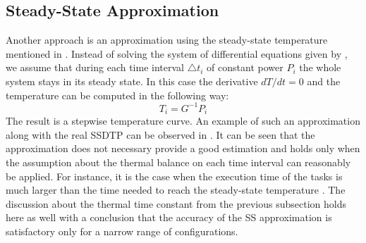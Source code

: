 \subsection{Steady-State Approximation}
Another approach is an approximation using the steady-state temperature mentioned in \cite{huang2009}. Instead of solving the system of differential equations given by , we assume that during each time interval $\triangle t_i$ of constant power $P_i$ the whole system stays in its steady state. In this case the derivative \mbox{$dT/dt = 0$} and the temperature can be computed in the following way:
\[
  T_i = G^{-1} P_i
\]
The result is a stepwise temperature curve. An example of such an approximation along with the real SSDTP can be observed in . It can be seen that the approximation does not necessary provide a good estimation and holds only when the assumption about the thermal balance on each time interval can reasonably be applied. For instance, it is the case when the execution time of the tasks is much larger than the time needed to reach the steady-state temperature \cite{huang2009}. The discussion about the thermal time constant from the previous subsection holds here as well with a conclusion that the accuracy of the SS approximation is satisfactory only for a narrow range of configurations.
